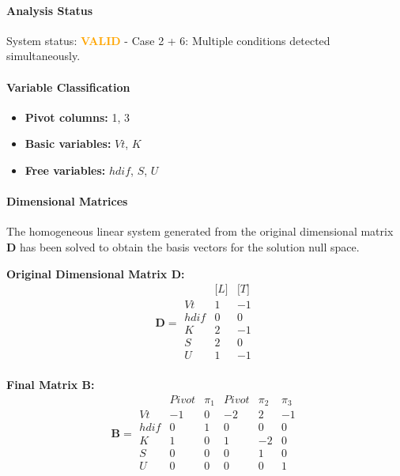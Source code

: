 \paragraph{Analysis Status}
System status: \textcolor{orange}{\textbf{VALID}} - Case 2 + 6: Multiple conditions detected simultaneously.


\paragraph{Variable Classification}
\begin{itemize}
\item \textbf{Pivot columns:} 1, 3
\item \textbf{Basic variables:} $Vt$, $K$
\item \textbf{Free variables:} $hdif$, $S$, $U$
\end{itemize}

                \paragraph{Dimensional Matrices}
                The homogeneous linear system generated from the original dimensional matrix $\mathbf{D}$ has been solved to obtain the basis vectors for the solution null space.

                \textbf{Original Dimensional Matrix $\mathbf{D}$:}
                \[\mathbf{D} = \begin{array}{r|rr}
                & \text{[}L\text{]} & \text{[}T\text{]} \\
                \hline
                Vt & 1 & -1 \\
hdif & 0 & 0 \\
K & 2 & -1 \\
S & 2 & 0 \\
U & 1 & -1 \\

                \end{array}\]


        \textbf{Final Matrix $\mathbf{B}$:}
        \[\mathbf{B} = \begin{array}{r|rrrrr}
        & Pivot & \pi_{1} & Pivot & \pi_{2} & \pi_{3} \\
        \hline
        Vt & -1 & 0 & -2 & 2 & -1 \\
hdif & 0 & 1 & 0 & 0 & 0 \\
K & 1 & 0 & 1 & -2 & 0 \\
S & 0 & 0 & 0 & 1 & 0 \\
U & 0 & 0 & 0 & 0 & 1 \\

        \end{array}\]

